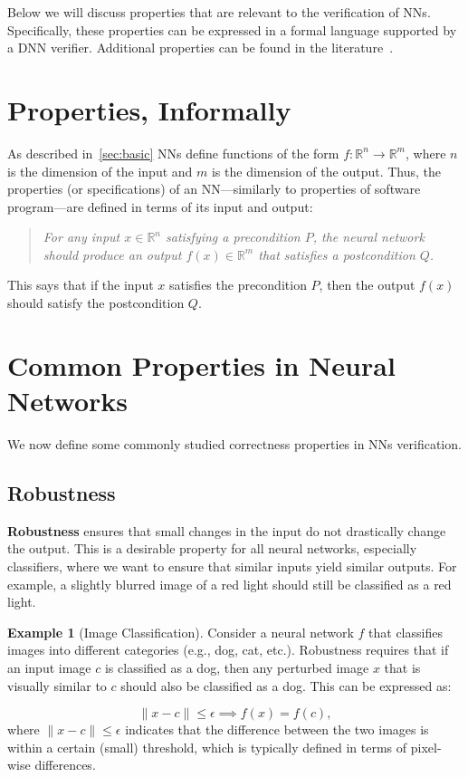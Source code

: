 \documentclass[oneside,11pt,dvipsnames]{book}
\numberwithin{equation}{section}
\theoremstyle{definition}
\newtheorem{example}{Example}[section]
\theoremstyle{remark}
\begin{document}
Below we will discuss properties that are relevant to the verification of NNs. Specifically, these properties can be 
expressed in a formal language supported by a DNN verifier. Additional properties can be found in the literature~\cite{seshia2018formal}.

\section{Properties, Informally}

As described in~\autoref{sec:basic} NNs define functions of the form $f: \mathbb{R}^{n} \to \mathbb{R}^{m}$, 
where $n$ is the dimension of the input and $m$ is the dimension of the output. Thus, the properties (or specifications) of an NN---similarly to properties of software program---are defined in terms of its input and output:

\begin{quote}
\textit{For any input $x \in \mathbb{R}^{n}$ satisfying a precondition $P$, the neural network should produce an output $f(x) \in \mathbb{R}^{m}$ that satisfies a postcondition $Q$.}
\end{quote}

This says that if the input $x$ satisfies the precondition $P$, then the output $f(x)$ should satisfy the postcondition $Q$.






\section{Common Properties in Neural Networks}

We now define some commonly studied correctness properties in NNs verification.

\subsection{Robustness}

\textbf{Robustness} ensures that small changes in the input do not drastically change the output. This is a desirable property for all neural networks, especially classifiers, where we want to ensure that similar inputs yield similar outputs. For example, a slightly blurred image of a red light should still be classified as a red light.

\begin{example}[Image Classification]
Consider a neural network $f$ that classifies images into different categories (e.g., dog, cat, etc.). Robustness requires that if an input image $c$ is classified as a dog, then any perturbed image $x$ that is visually similar to $c$ should also be classified as a dog. This can be expressed as:

\[
\|x - c\| \leq \epsilon \implies f(x) = f(c), 
\]
where $\|x - c\| \leq \epsilon$ indicates that the difference between the two images is within a certain (small) threshold, which is typically defined in terms of pixel-wise differences.
\end{example}
\end{document}
